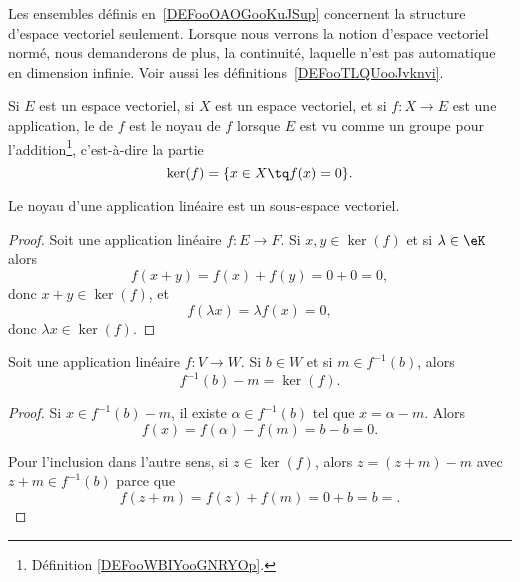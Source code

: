 \begin{remark}
	Les ensembles définis en~\ref{DEFooOAOGooKuJSup} concernent la structure d'espace vectoriel seulement. Lorsque nous verrons la notion d'espace vectoriel normé, nous demanderons de plus, la continuité, laquelle n'est pas automatique en dimension infinie. Voir aussi les définitions~\ref{DEFooTLQUooJvknvi}.
\end{remark}

\begin{definition}
	Si \( E\) est un espace vectoriel, si \( X\) est un espace vectoriel, et si \( f\colon X\to E\) est une application, le  de \( f\) est le noyau de \( f\) lorsque \( E\) est vu comme un groupe pour l'addition\footnote{Définition \ref{DEFooWBIYooGNRYOp}.}, c'est-à-dire la partie
	\begin{equation}
		\ker(f)=\{ x\in X\tq f(x)=0 \}.
	\end{equation}
\end{definition}

\begin{proposition}     \label{PROPooRLLPooKYzsJp}
	Le noyau d'une application linéaire est un sous-espace vectoriel.
\end{proposition}

\begin{proof}
	Soit une application linéaire \( f\colon E\to F\). Si \( x,y\in \ker(f)\) et si \( \lambda\in \eK\) alors
	\begin{equation}
		f(x+y)=f(x)+f(y)=0+0=0,
	\end{equation}
	donc \( x+y\in \ker(f)\), et
	\begin{equation}
		f(\lambda x)=\lambda f(x)=0,
	\end{equation}
	donc \( \lambda x\in \ker(f)\).
\end{proof}

\begin{lemma}        \label{LEMooIQJMooJWRbub}
	Soit une application linéaire \( f\colon V\to W\). Si \( b\in W\) et si \( m\in f^{-1}(b)\), alors
	\begin{equation}
		f^{-1}(b)-m=\ker(f).
	\end{equation}
\end{lemma}

\begin{proof}
	Si \( x\in f^{-1}(b)-m\), il existe \( \alpha\in f^{-1}(b)\) tel que \( x=\alpha-m\). Alors
	\begin{equation}
		f(x)=f(\alpha)-f(m)=b-b=0.
	\end{equation}

	Pour l'inclusion dans l'autre sens, si \( z\in \ker(f)\), alors \( z=(z+m)-m\) avec \( z+m\in f^{-1}(b)\) parce que
	\begin{equation}
		f(z+m)=f(z)+f(m)=0+b=b=.
	\end{equation}
\end{proof}

